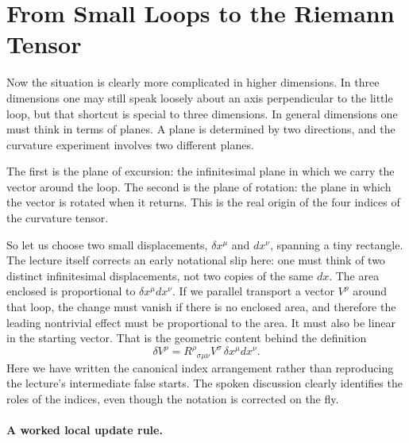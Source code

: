 \section{From Small Loops to the Riemann Tensor}

Now the situation is clearly more complicated in higher dimensions. In three dimensions one may still speak loosely about an axis perpendicular to the little loop, but that shortcut is special to three dimensions. In general dimensions one must think in terms of planes. A plane is determined by two directions, and the curvature experiment involves two different planes.

The first is the plane of excursion: the infinitesimal plane in which we carry the vector around the loop. The second is the plane of rotation: the plane in which the vector is rotated when it returns. This is the real origin of the four indices of the curvature tensor.

So let us choose two small displacements, \(\delta x^\mu\) and \(dx^\nu\), spanning a tiny rectangle. The lecture itself corrects an early notational slip here: one must think of two distinct infinitesimal displacements, not two copies of the same \(dx\). The area enclosed is proportional to \(\delta x^\mu dx^\nu\). If we parallel transport a vector \(V^\rho\) around that loop, the change must vanish if there is no enclosed area, and therefore the leading nontrivial effect must be proportional to the area. It must also be linear in the starting vector. That is the geometric content behind the definition
\begin{equation}
\delta V^\rho = R^\rho{}_{\sigma\mu\nu}V^\sigma\,\delta x^\mu dx^\nu.
\end{equation}
Here we have written the canonical index arrangement rather than reproducing the lecture's intermediate false starts. The spoken discussion clearly identifies the roles of the indices, even though the notation is corrected on the fly.

\paragraph{A worked local update rule.}

